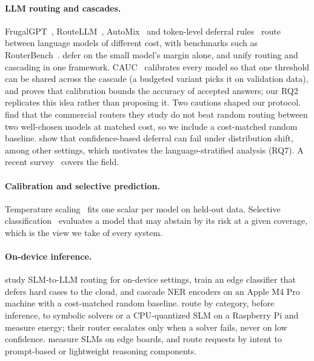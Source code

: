 \documentclass[11pt,a4paper]{article}
\begin{document}
\paragraph{LLM routing and cascades.} FrugalGPT~\citep{chen2023frugalgpt}, RouteLLM~\citep{ong2024routellm},
AutoMix~\citep{aggarwal2024automix} and token-level deferral rules~\citep{gupta2024lmcascades} route between language
models of different cost, with benchmarks such as RouterBench~\citep{hu2024routerbench}. \citet{ramirez2024twotier}
defer on the small model's margin alone, and \citet{dekoninck2025cascaderouting} unify routing and cascading in one
framework. CAUC~\citep{zhang2026cauc} calibrates every model so that one threshold can be shared across the cascade (a
budgeted variant picks it on validation data), and proves that calibration bounds the accuracy of accepted answers; our
RQ2 replicates this idea rather than proposing it. Two cautions shaped our protocol. \citet{wang2026misguided} find that the commercial routers they study do
not beat random routing between two well-chosen models at matched cost, so we include a cost-matched random baseline. \citet{jitkrittum2023deferral} show that
confidence-based deferral can fail under distribution shift, among other settings, which motivates the
language-stratified analysis (RQ7).
A recent survey~\citep{moslem2026routingsurvey} covers the field.

\paragraph{Calibration and selective prediction.} Temperature scaling~\citep{guo2017calibration} fits one scalar per
model on held-out data. Selective classification~\citep{geifman2017selective} evaluates a model that may abstain by its
risk at a given coverage, which is the view we take of every system.

\paragraph{On-device inference.} \citet{chuang2025ondevice} study SLM-to-LLM routing for on-device settings,
\citet{kag2023edgeselective} train an edge classifier that defers hard cases to the cloud, and
\citet{chaganti2026ondevicener} cascade NER encoders on an Apple M4 Pro machine with a cost-matched random baseline.
\citet{sadhu2026neurosymbolic} route by category, before inference, to symbolic solvers or a CPU-quantized SLM on a
Raspberry Pi and measure energy; their router escalates only when a solver fails, never on low confidence. \citet{islam2025energy} measure SLMs on
edge boards, and \citet{lim2026adahome} route requests by intent to prompt-based or lightweight
reasoning components.
\end{document}
